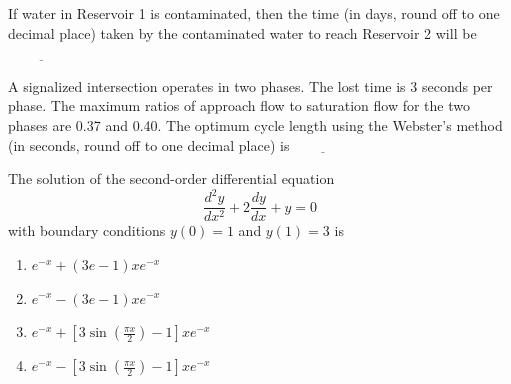 If water in Reservoir 1 is contaminated, then the time (in days, round off to one decimal place) taken by the contaminated water to reach  Reservoir 2 will be$\underline{\hspace{2cm}}$
\bigskip
\item A signalized intersection operates in two phases. The lost time is 3 seconds per phase. The maximum ratios of approach flow to saturation flow for the two phases are 0.37 and 0.40. The optimum cycle length using the Webster's method (in seconds, round off to one decimal place) is$\underline{\hspace{2cm}}$
\bigskip
    \item The solution of the second-order differential equation 
    \[
    \frac{d^2 y}{dx^2} + 2 \frac{dy}{dx} + y = 0
    \]
    with boundary conditions $y(0) = 1$ and $y(1) = 3$ is
    \begin{enumerate}
        \item $e^{-x} + (3e - 1) x e^{-x}$
        \item $e^{-x} - (3e - 1) x e^{-x}$
        \item $e^{-x} + \left[ 3 \sin \left( \frac{\pi x}{2} \right) - 1 \right] x e^{-x}$
        \item $e^{-x} - \left[ 3 \sin \left( \frac{\pi x}{2} \right) - 1 \right] x e^{-x}$
    \end{enumerate}

